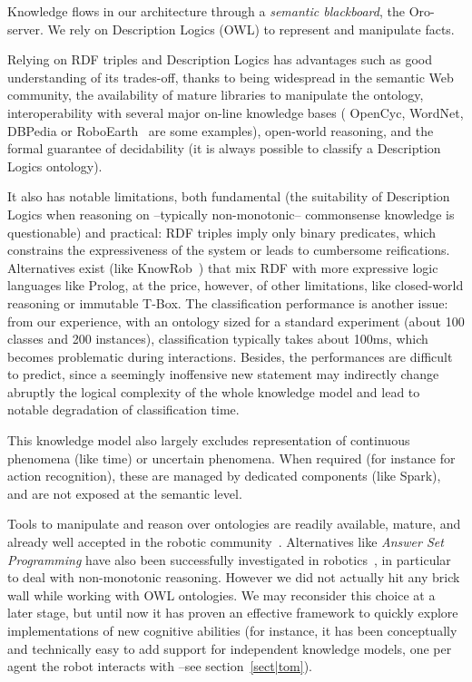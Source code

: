\documentclass[preprint,3p,times]{elsarticle}
\begin{document}
Knowledge flows in our architecture through a \emph{semantic blackboard}, the
{\sc Oro}-server. We rely on Description Logics (OWL) to represent and
manipulate facts.

Relying on RDF triples and Description Logics has advantages such as good
understanding of its trades-off, thanks to being widespread in the semantic Web
community, the availability of mature libraries to manipulate the ontology,
interoperability with several major on-line knowledge bases ({\sc
OpenCyc}, {\sc WordNet}, {\sc DBPedia} or {\sc RoboEarth}~\cite{Waibel2011} are
some examples), open-world reasoning, and the formal guarantee of decidability
(it is always possible to classify a Description Logics ontology).

It also has notable limitations, both fundamental (the suitability of
Description Logics when reasoning on --typically non-monotonic-- commonsense
knowledge is questionable) and practical: RDF triples imply only binary
predicates, which constrains the expressiveness of the system or leads to
cumbersome reifications. Alternatives exist (like {\sc
KnowRob}~\cite{Tenorth2009a}) that mix RDF with more expressive logic languages
like {\sc Prolog}, at the price, however, of other limitations, like
closed-world reasoning or immutable T-Box. The classification performance is
another issue: from our experience, with an ontology sized for a standard
experiment (about 100 classes and 200 instances), classification typically
takes about 100ms, which becomes problematic during interactions.  Besides, the
performances are difficult to predict, since a seemingly inoffensive new
statement may indirectly change abruptly the logical complexity of the whole
knowledge model and lead to notable degradation of classification time.

This knowledge model also largely excludes representation of continuous
phenomena (like time) or uncertain phenomena. When required (for instance for
action recognition), these are managed by dedicated components (like {\sc
Spark}), and are not exposed at the semantic level.

Tools to manipulate and reason over ontologies are readily available, mature,
and already well accepted in the robotic community~\cite{Tenorth2009a,
Lim2011}. Alternatives like \emph{Answer Set Programming} have also been
successfully investigated in robotics~\cite{Chen2010,Erdem2012}, in particular
to deal with non-monotonic reasoning. However we did not actually hit any brick wall
while working with OWL ontologies. We may reconsider this choice at a later
stage, but until now it has proven an effective framework to quickly explore
implementations of new cognitive abilities (for instance, it has been
conceptually and technically easy to add support for independent knowledge
models, one per agent the robot interacts with --see section~\ref{sect|tom}).
\end{document}
